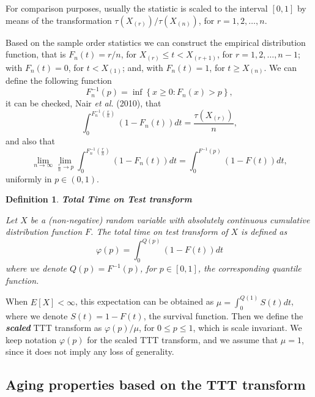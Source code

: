\documentclass[preprint,12pt]{elsarticle}
\newtheorem{dfn}{{\sc Definition}}[section]
\begin{document}
For comparison purposes, usually the statistic is scaled to the interval $[0,1]$ by means of the transformation $\tau\left(X_{(r)}\right)/\tau\left(X_{(n)}\right)$, for $r=1,2,\ldots,n$.

Based on the sample order statistics we can construct the empirical distribution function, that is $F_n(t)=r/n$, for $X_{(r)} \leq t < X_{(r+1)}$, for $r=1,2,\ldots,n-1$; with $F_n(t)=0$, for $t <X_{(1)}$; and, with $F_n(t)=1$, for $t \geq X_{(n)}$. We can define the following function
\[
F^{-1}_n(p)= \inf \left\{x \geq 0:F_n(x) >p\right\},
\]
it can be checked, Nair {\it et al.} (2010), that
\[
\int_0^{F^{-1}_n\left(\frac{r}{n}\right)} \left(1-F_n(t)\right)dt= \frac{\tau\left(X_{(r)}\right)}{n},
\]
and also that
\[
\underset{n\rightarrow \infty}{\lim}\underset{\frac{r}{n}\rightarrow p}{\lim}\int_0^{F^{-1}_n\left(\frac{r}{n}\right)}\left(1-F_n(t)\right) dt= \int_0^{F^{-1}(p)}\left(1-F(t)\right) dt,
\]
uniformly in $p\in (0,1)$. 

\begin{dfn}\textbf{Total Time on Test transform} \label{ttt.def2} 

\noindent Let $X$ be a (non-negative) random variable with absolutely continuous cumulative distribution function $F$. The \textit{total time on test transform} of $X$ is defined as
\begin{equation} \label{ttt.curve}
\varphi(p) =\int_0^{Q(p)}\left(1-F(t)\right) dt
\end{equation}
where we denote $Q(p)= F^{-1}(p)$, for $p\in [0,1]$, the corresponding quantile function.
\end{dfn}
When $E[X] < \infty$, this expectation can be obtained as $\mu=\int_0^{Q(1)} S(t)dt$, where we denote $S(t)=1-F(t)$, the survival function. Then we define the \textbf{\textit{scaled}} TTT transform as $\varphi(p)/\mu$, for $0 \leq p \leq 1$,  which is scale invariant. We keep notation $\varphi(p)$ for the scaled TTT transform, and we assume that $\mu=1$, since it does not imply any loss of generality.


\subsection{Aging properties based on the TTT transform}\label{sec:aging}
\end{document}
